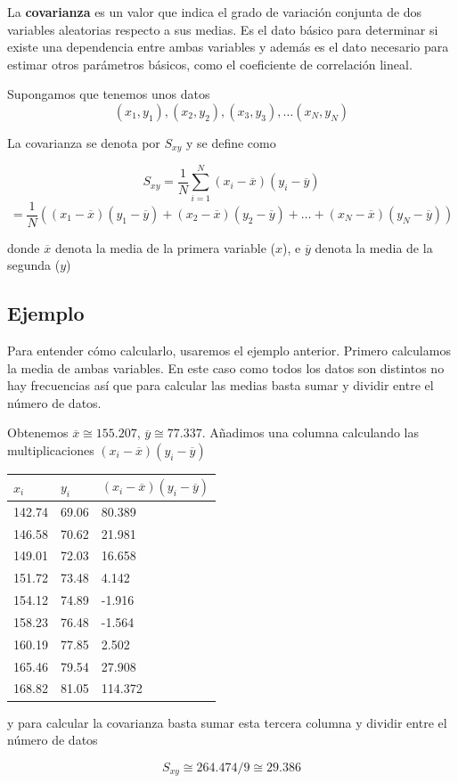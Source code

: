 \documentclass[]{book}
\theoremstyle{plain}
\theoremstyle{definition}
\begin{document}
La \textbf{covarianza} es un valor que indica el grado de variación
conjunta de dos variables aleatorias respecto a sus medias. Es el dato
básico para determinar si existe una dependencia entre ambas variables y
además es el dato necesario para estimar otros parámetros básicos, como
el coeficiente de correlación lineal.

Supongamos que tenemos unos datos
\[(x_1, y_1), (x_2, y_2), (x_3,y_3), \ldots (x_N,y_N)\]

La covarianza se denota por \(S_{xy}\) y se define como

\[ S_{xy} = \frac{1}{N}\sum^N_{i=1}(x_i - \overline{x})(y_i - \overline{y}) \]
\[ =\frac{1}{N}((x_1- \overline x)(y_1 - \overline y)+ (x_2- \overline x)(y_2 - \overline y)+ \ldots +(x_N- \overline x)(y_N - \overline y))\]

donde \(\overline x\) denota la media de la primera variable (\(x\)), e
\(\overline y\) denota la media de la segunda (\(y\))

\hypertarget{ejemplo-1}{%
\subsection{Ejemplo}\label{ejemplo-1}}

Para entender cómo calcularlo, usaremos el ejemplo anterior. Primero
calculamos la media de ambas variables. En este caso como todos los
datos son distintos no hay frecuencias así que para calcular las medias
basta sumar y dividir entre el número de datos.

Obtenemos \(\overline x \cong155.207\), \(\overline y \cong77.337\).
Añadimos una columna calculando las multiplicaciones
\((x_i - \overline{x})(y_i - \overline{y})\)

\begin{longtable}[]{@{}lll@{}}
\toprule
\(x_i\) & \(y_i\) &
\((x_i - \overline{x})(y_i - \overline{y})\)\tabularnewline
\midrule
\endhead
142.74 & 69.06 & 80.389\tabularnewline
146.58 & 70.62 & 21.981\tabularnewline
149.01 & 72.03 & 16.658\tabularnewline
151.72 & 73.48 & 4.142\tabularnewline
154.12 & 74.89 & -1.916\tabularnewline
158.23 & 76.48 & -1.564\tabularnewline
160.19 & 77.85 & 2.502\tabularnewline
165.46 & 79.54 & 27.908\tabularnewline
168.82 & 81.05 & 114.372\tabularnewline
\bottomrule
\end{longtable}

y para calcular la covarianza basta sumar esta tercera columna y dividir
entre el número de datos

\[S_{xy} \cong 264.474/9 \cong 29.386\]
\end{document}
